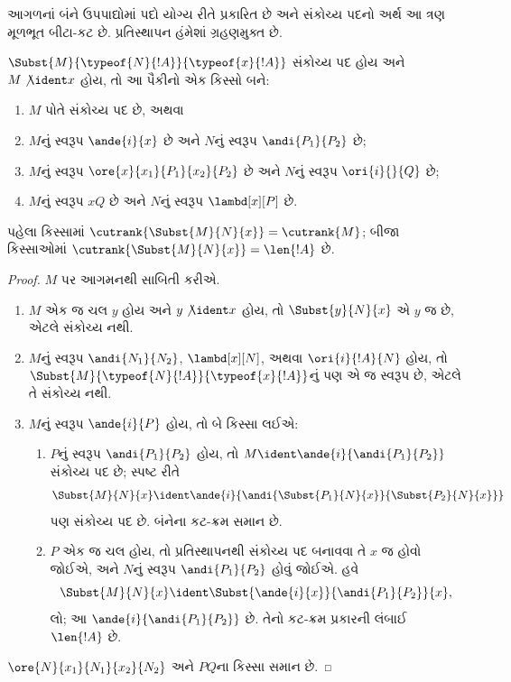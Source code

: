 \documentclass[../../../include/open-logic-section]{subfiles}
\begin{document}
આગળનાં બંને ઉપપાદ્યોમાં પદો યોગ્ય રીતે પ્રકારિત
છે અને સંકોચ્ય પદનો અર્થ આ ત્રણ મૂળભૂત બીટા-કટ
છે. પ્રતિસ્થાપન હંમેશાં ગ્રહણમુક્ત છે.
\begin{lem}
  $\Subst{M}{\typeof{N}{!A}}{\typeof{x}{!A}}$ સંકોચ્ય પદ
  હોય અને $M \not\ident x$ હોય, તો આ પૈકીનો
  એક કિસ્સો બને:
  \begin{enumerate}
  \item $M$ પોતે સંકોચ્ય પદ છે, અથવા
  \item $M$નું સ્વરૂપ $\ande{i}{x}$ છે અને
    $N$નું સ્વરૂપ $\andi{P_1}{P_2}$ છે;
  \item $M$નું સ્વરૂપ $\ore{x}{x_1}{P_1}{x_2}{P_2}$ છે અને
    $N$નું સ્વરૂપ $\ori{i}{}{Q}$ છે;
  \item $M$નું સ્વરૂપ $x Q$ છે અને
    $N$નું સ્વરૂપ $\lambd[x][P]$ છે.
  \end{enumerate}
  પહેલા કિસ્સામાં $\cutrank{\Subst{M}{N}{x}} = \cutrank{M}$;
  બીજા કિસ્સાઓમાં $\cutrank{\Subst{M}{N}{x}} = \len{!A}$ છે.
\end{lem}
\begin{proof}
  $M$ પર આગમનથી સાબિતી કરીએ.
  \begin{enumerate}
  \item $M$ એક જ ચલ $y$ હોય અને $y \not\ident x$ હોય,
    તો $\Subst{y}{N}{x}$ એ $y$ જ છે, એટલે સંકોચ્ય નથી.
  \item $M$નું સ્વરૂપ $\andi{N_1}{N_2}$, $\lambd[x][N]$,
    અથવા $\ori{i}{!A}{N}$ હોય, તો
    $\Subst{M}{\typeof{N}{!A}}{\typeof{x}{!A}}$નું પણ
    એ જ સ્વરૂપ છે, એટલે તે સંકોચ્ય નથી.
  \item $M$નું સ્વરૂપ $\ande{i}{P}$ હોય, તો બે કિસ્સા લઈએ:
    \begin{enumerate}
      \item $P$નું સ્વરૂપ $\andi{P_1}{P_2}$ હોય, તો
        $M \ident \ande{i}{\andi{P_1}{P_2}}$ સંકોચ્ય પદ છે;
        સ્પષ્ટ રીતે
        \[
        \Subst{M}{N}{x} \ident
        \ande{i}{\andi{\Subst{P_1}{N}{x}}{\Subst{P_2}{N}{x}}}
        \]
        પણ સંકોચ્ય પદ છે. બંનેના કટ-ક્રમ સમાન છે.
      \item $P$ એક જ ચલ હોય, તો પ્રતિસ્થાપનથી સંકોચ્ય
        પદ બનાવવા તે $x$ જ હોવો જોઈએ, અને $N$નું
        સ્વરૂપ $\andi{P_1}{P_2}$ હોવું જોઈએ. હવે
        \[
        \Subst{M}{N}{x} \ident \Subst{\ande{i}{x}}{\andi{P_1}{P_2}}{x},
        \]
        લો; આ $\ande{i}{\andi{P_1}{P_2}}$ છે.
        તેનો કટ-ક્રમ પ્રકારની લંબાઈ $\len{!A}$ છે.
    \end{enumerate}
  \end{enumerate}
  $\ore{N}{x_1}{N_1}{x_2}{N_2}$ અને $P Q$ના કિસ્સા સમાન છે.
  
\end{proof}
\end{document}
